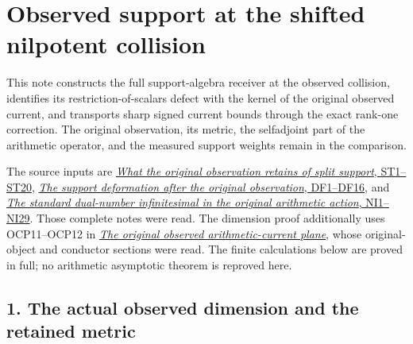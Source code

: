 \documentclass[
]{article}
\author{}
\date{}
\begin{document}
{
\setcounter{tocdepth}{3}
\tableofcontents
}
\section{Observed support at the shifted nilpotent
collision}\label{observed-support-at-the-shifted-nilpotent-collision}

This note constructs the full support-algebra receiver at the observed
collision, identifies its restriction-of-scalars defect with the kernel
of the original observed current, and transports sharp signed current
bounds through the exact rank-one correction. The original observation,
its metric, the selfadjoint part of the arithmetic operator, and the
measured support weights remain in the comparison.

The source inputs are
\href{https://github.com/KokunoYumeto/zeta-function-research-reader/blob/4ba9285b66af58a6d58fc502a494c1fb45ca5b79/workbenches/splitzero-tandem/continuations/20260922-support-transport/SUPPORT_SPECTRUM_AND_TERMINAL_MASS.md}{\emph{What
the original observation retains of split support}, ST1--ST20},
\href{https://github.com/KokunoYumeto/zeta-function-research-reader/blob/4ba9285b66af58a6d58fc502a494c1fb45ca5b79/workbenches/splitzero-tandem/continuations/20260922-support-transport/OBSERVED_DEFORMATION_AND_CURRENT.md}{\emph{The
support deformation after the original observation}, DF1--DF16}, and
\href{https://github.com/KokunoYumeto/zeta-function-research-reader/blob/6af54ea3c8ef99127af327f3103e086c68d482c2/workbenches/splitzero-tandem/branches/identity-absorber-square/NATIVE_DUAL_NUMBER_RECEIVER.md}{\emph{The
standard dual-number infinitesimal in the original arithmetic action},
NI1--NI29}. Those complete notes were read. The dimension proof
additionally uses OCP11--OCP12 in
\href{https://github.com/KokunoYumeto/zeta-function-research-reader/blob/6af54ea3c8ef99127af327f3103e086c68d482c2/workbenches/splitzero-tandem/branches/identity-absorber-square/sources/OBSERVED_CURRENT_PLANE.tex}{\emph{The
original observed arithmetic-current plane}}, whose original-object and
conductor sections were read. The finite calculations below are proved
in full; no arithmetic asymptotic theorem is reproved here.

\subsection{1. The actual observed dimension and the retained
metric}\label{the-actual-observed-dimension-and-the-retained-metric}
\end{document}
